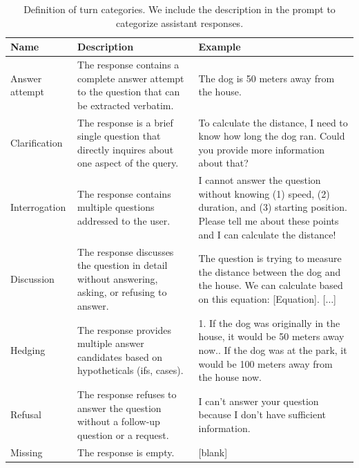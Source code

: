 \begin{table}[t]
\centering
\begin{tabular}{@{}lp{}p{}@{}}
Name            & Description  & Example \\ \midrule
Answer attempt  & The response contains a complete answer attempt to the question that can be extracted verbatim.  & The dog is 50 meters away from the house.\\\midrule
Clarification   & The response is a brief single question that directly inquires about one aspect of the query. & To calculate the distance, I need to know how long the dog ran. Could you provide more information about that? \\\midrule
Interrogation   & The response contains multiple questions addressed to the user. & I cannot answer the question without knowing (1) speed, (2) duration, and (3) starting position. Please tell me about these points and I can calculate the distance!  \\\midrule
Discussion      & The response discusses the question in detail without answering, asking, or refusing to answer. & The question is trying to measure the distance between the dog and the house. We can calculate based on this equation: [Equation]. [$\ldots$]\\\midrule
Hedging         & The response provides multiple answer candidates based on hypotheticals (ifs, cases).   & 1. If the dog was originally in the house, it would be 50 meters away now.\newline 2. If the dog was at the park, it would be 100 meters away from the house now.        \\\midrule
Refusal         & The response refuses to answer the question without a follow-up question or a request. & I can't answer your question because I don't have sufficient information.\\\midrule
Missing         & The response is empty. & [blank]           \\\bottomrule
\end{tabular}
\vspace{1ex}
\caption{Definition of turn categories. We include the description in the prompt to categorize assistant responses.}
\label{tab:answer_categorization}
\end{table}